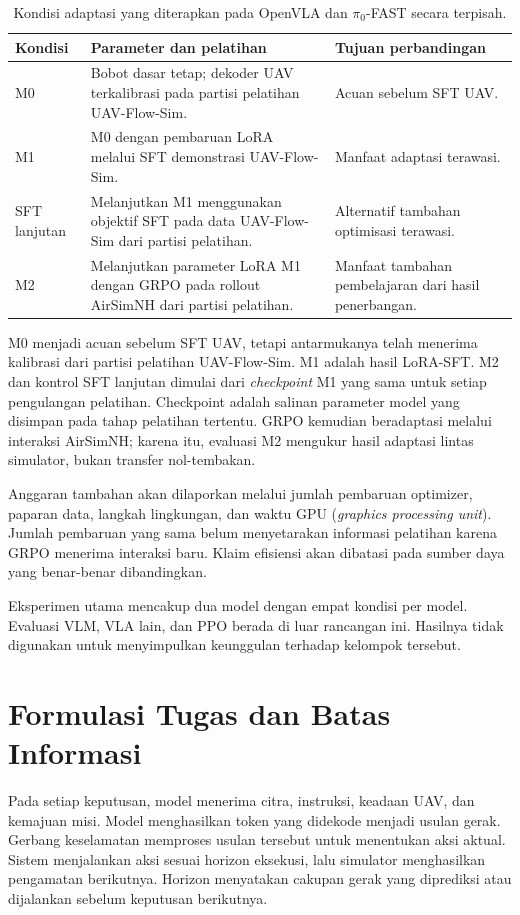 \begin{table}[htbp]
\centering
\caption{Kondisi adaptasi yang diterapkan pada OpenVLA dan $\pi_0$-FAST secara terpisah.}
\label{tab:kondisi_adaptasi}
\small
\begin{tabularx}{\linewidth}{|p{2.1cm}|X|X|}
\hline
\textbf{Kondisi} & \textbf{Parameter dan pelatihan} & \textbf{Tujuan perbandingan} \\
\hline
M0 & Bobot dasar tetap; dekoder UAV terkalibrasi pada partisi pelatihan UAV-Flow-Sim. & Acuan sebelum SFT UAV. \\
\hline
M1 & M0 dengan pembaruan LoRA melalui SFT demonstrasi UAV-Flow-Sim. & Manfaat adaptasi terawasi. \\
\hline
SFT lanjutan & Melanjutkan M1 menggunakan objektif SFT pada data UAV-Flow-Sim dari partisi pelatihan. & Alternatif tambahan optimisasi terawasi. \\
\hline
M2 & Melanjutkan parameter LoRA M1 dengan GRPO pada rollout AirSimNH dari partisi pelatihan. & Manfaat tambahan pembelajaran dari hasil penerbangan. \\
\hline
\end{tabularx}
\end{table}
M0 menjadi acuan sebelum SFT UAV, tetapi antarmukanya telah menerima kalibrasi dari partisi pelatihan UAV-Flow-Sim. M1 adalah hasil LoRA-SFT. M2 dan kontrol SFT lanjutan dimulai dari \textit{checkpoint} M1 yang sama untuk setiap pengulangan pelatihan. Checkpoint adalah salinan parameter model yang disimpan pada tahap pelatihan tertentu. GRPO kemudian beradaptasi melalui interaksi AirSimNH; karena itu, evaluasi M2 mengukur hasil adaptasi lintas simulator, bukan transfer nol-tembakan.

Anggaran tambahan akan dilaporkan melalui jumlah pembaruan optimizer, paparan data, langkah lingkungan, dan waktu GPU (\textit{graphics processing unit}). Jumlah pembaruan yang sama belum menyetarakan informasi pelatihan karena GRPO menerima interaksi baru. Klaim efisiensi akan dibatasi pada sumber daya yang benar-benar dibandingkan.

Eksperimen utama mencakup dua model dengan empat kondisi per model. Evaluasi VLM, VLA lain, dan PPO berada di luar rancangan ini. Hasilnya tidak digunakan untuk menyimpulkan keunggulan terhadap kelompok tersebut.

\section{Formulasi Tugas dan Batas Informasi}
\label{sec:formulasi_tugas}
Pada setiap keputusan, model menerima citra, instruksi, keadaan UAV, dan kemajuan misi. Model menghasilkan token yang didekode menjadi usulan gerak. Gerbang keselamatan memproses usulan tersebut untuk menentukan aksi aktual. Sistem menjalankan aksi sesuai horizon eksekusi, lalu simulator menghasilkan pengamatan berikutnya. Horizon menyatakan cakupan gerak yang diprediksi atau dijalankan sebelum keputusan berikutnya.

